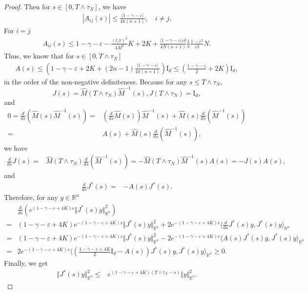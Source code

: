 \documentclass[11pt]{article}
\numberwithin{equation}{section}%
\numberwithin{figure}{section}%
\theoremstyle{remark}
\begin{document}
\begin{proof}
		Then for $s\in [0,T\wedge\tau_{N}]$, we have 
		\begin{align*}
			|A_{ij}(s)|\leq \frac{|1-\gamma-\varepsilon|}{4\pi(n+1)},\quad i\neq j.
		\end{align*}
		For $i=j$
		\begin{align*}
			A_{ii}(s)\leq 1-\gamma-\varepsilon-\frac{(l_{i}\pi)^{2}}{4M^{2}}K+2K+ \frac{|1-\gamma-\varepsilon|\varepsilon\delta}{4N(n+1)}\frac{1}{\pi}\frac{1-\varepsilon^{2}}{\varepsilon\delta}N.
		\end{align*}
		Thus, we know that for $s\in [0,T\wedge\tau_{N}]$
		\begin{align*}
			A(s)\leq \left( 1-\gamma-\varepsilon+2K+(2n-1) \frac{|1-\gamma-\varepsilon|}{4\pi(n+1)}\right)\text{I}_{d}\leq\left( \frac{1-\gamma-\varepsilon}{2}+2K\right)\text{I}_{d},
		\end{align*}
		in the order of the non-negative definiteness. Because for any $s\leq T\wedge\tau_{N}$, 
		$$J(s)=\hat{M}(T\wedge\tau_{N})\hat{M}^{-1}(s),J(T\wedge\tau_{N})=\text{I}_{d},$$
		and
		\begin{align*}
		0=\frac{d}{ds}(\hat{M}(s)\hat{M}^{-1}(s))=&(\frac{d}{ds}\hat{M}(s))\hat{M}^{-1}(s)+\hat{M}(s)\frac{d}{ds}(\hat{M}^{-1}(s))\\
		=&A(s)+\hat{M}(s)\frac{d}{ds}(\hat{M}^{-1}(s)),
		\end{align*}
		we have
		\begin{align*}
			\frac{d}{ds}J(s)=&\hat{M}(T\wedge\tau_{N})\frac{d}{ds}(\hat{M}^{-1}(s))=-\hat{M}(T\wedge\tau_{N})\hat{M}^{-1}(s)A(s)=-J(s)A(s),
		\end{align*}
		and
			\begin{align*}
			\frac{d}{ds}J^{*}(s)=&-A(s)J^{*}(s).
		\end{align*}
		Therefore, for any $y\in\mathbb{R}^{n}$
		\begin{equation}\label{eq:stopoperestimete}
			\begin{split}
				&\frac{d}{ds}(e^{(1-\gamma-\varepsilon+4K)s}\Vert J^{*}(s)y\Vert^{2}_{\mathbb{R}^{n}})\\
				=&(1-\gamma-\varepsilon+4K)e^{-(1-\gamma-\varepsilon+4K)s}\Vert J^{*}(s)y\Vert^{2}_{\mathbb{R}^{n}}+2e^{-(1-\gamma-\varepsilon+4K)s}\langle \frac{d}{ds}J^{*}(s)y,J^{*}(s)y\rangle_{\mathbb{R}^{n}}\\
				=&(1-\gamma-\varepsilon+4K)e^{-(1-\gamma-\varepsilon+4K)s}\Vert J^{*}(s)y\Vert^{2}_{\mathbb{R}^{n}}-2e^{-(1-\gamma-\varepsilon+4K)s}\langle A(s)J^{*}(s)y,J^{*}(s)y\rangle_{\mathbb{R}^{n}}\\
				=&2e^{-(1-\gamma-\varepsilon+4K)s}\langle (\frac{1-\gamma-\varepsilon+4K}{2}\text{I}_{d}-A(s))J^{*}(s)y,J^{*}(s)y\rangle_{\mathbb{R}^{n}}\geq 0.
			\end{split}
		\end{equation}	
		Finally, we get
		\begin{align*}
			\Vert J^{*}(s)y\Vert^{2}_{\mathbb{R}^{n}}\leq&e^{(1-\gamma-\varepsilon+4K)(T\wedge\tau_{N}-s)}\Vert y\Vert^{2}_{\mathbb{R}^{n}}.
		\end{align*}
	\end{proof}
\end{document}
